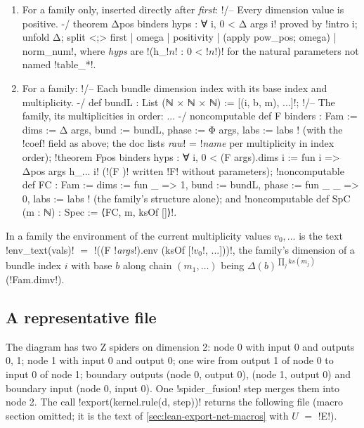 {\begin{enumerate}
\item For a family only, inserted directly after \textit{first}:
  \leanx!/-- Every dimension value is positive. -/ theorem Δpos binders hyps : ∀ i, 0 < Δ args i!
  proved by \leanx!intro i; unfold Δ; split <;> first | omega | positivity | (apply pow_pos; omega) | norm_num!,
  where \textit{hyps} are \code!(h_!$n$\code! : 0 < !$n$\code!)! for the natural parameters not
  named \code!table_*!.
\item For a family: \code!/-- Each bundle dimension index with its base index and multiplicity. -/ def bundL : List (ℕ × ℕ × ℕ) := [(i, b, m), ...]!;
  \leanx!/-- The family, its multiplicities in order: ... -/ noncomputable def F binders : Fam := { dims := Δ args, bund := bundL, phase := Φ args, labs := labs }!
  (with the \lean!coef! field as above; the doc lists \textit{raw}\code! = !\textit{name} per
  multiplicity in index order); \leanx!theorem Fpos binders hyps : ∀ i, 0 < (F args).dims i := fun i => Δpos args h_... i!
  (\code!(F )! written \code!F! without parameters);
  \code!noncomputable def FC : Fam := { dims := fun _ => 1, bund := bundL, phase := fun _ _ => 0, labs := labs }!
  (the family's structure alone); and
  \code!noncomputable def SpC (m : ℕ) : Spec := ⟨FC, m, ksOf []⟩!.
\end{enumerate}

In a family the environment of the current multiplicity values $v_0,\dots$ is the text
\py!env_text(vals)! $=$ \code!((F !\textit{args}\code!).env (ksOf [!$v_0$\code!, ...]))!, the
family's dimension of a bundle index $i$ with base $b$ along chain $(m_1,\dots)$ being
$\Delta(b)^{\prod_j \mathit{ks}(m_j)}$ (\lean!Fam.dimv!).

\subsection{A representative file}\label{sec:lean-export-net-example}

\begin{example}\label{ex:lean-export-net-fusion}
The diagram has two Z spiders on dimension 2: node 0 with input 0 and outputs 0, 1; node 1 with
input 0 and output 0; one wire from output 1 of node 0 to input 0 of node 1; boundary outputs
(node 0, output 0), (node 1, output 0) and boundary input (node 0, input 0). One
\code!spider_fusion! step merges them into node 2. The call
\py!export(kernel.rule(d, step))! returns the following file (macro section omitted; it is the
text of \cref{sec:lean-export-net-macros} with $U$ $=$ \code!E!).


\end{example}}

